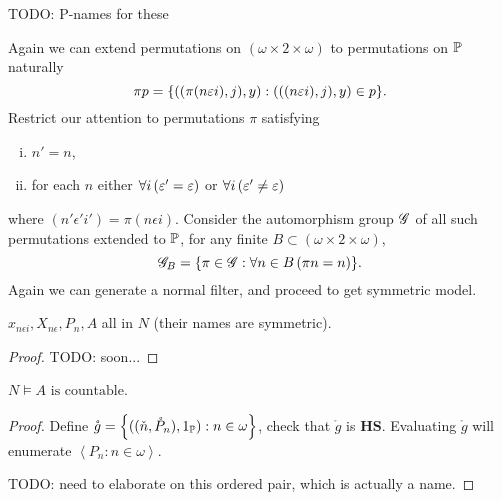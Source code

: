 TODO: P-names for these

Again we can extend permutations on \((\omega\times2\times\omega)\) to permutations on \(\P\) naturally
\[\pi p = \set{ ((\pi(n\epsilon i), j), y): (((n\epsilon i),j), y) \in p }.\]
Restrict our attention to permutations \(\pi\) satisfying
\begin{enumerate}[i.]
    \item \(n' = n\),
    \item for each \(n\) either \(\forall i\paren{\epsilon' = \epsilon}\) or \(\forall i\paren{\epsilon' \ne \epsilon}\)
\end{enumerate}
where \((n'\epsilon' i') = \pi(n\epsilon i)\).
Consider the automorphism group \(\G\) of all such permutations extended to \(\P\),
for any finite \(B\subset (\omega\times2\times\omega)\),
\[ \G_B = \set{ \pi\in \G: \forall n\in B\left( \pi n = n \right) }. \]
Again we can generate a normal filter, and proceed to get symmetric model.


\begin{lemma}
    \(x_{n\epsilon i}, X_{n\epsilon}, P_n, A\) all in \(N\) (their names are symmetric).
\end{lemma}
\begin{proof}
    TODO: soon...
\end{proof}

\begin{lemma}
    \(N\models A\text{ is countable}\).
\end{lemma}
\begin{proof}
  Define \(\mathring{g} = \set{((\check{n}, \mathring{P}_n), 1_\P): n\in\omega}\), check that \(\mathring{g}\) is \(\mathbf{HS}\).
  Evaluating \(\mathring{g}\) will enumerate \(\left\langle P_n: n\in\omega\right\rangle\).

  TODO: need to elaborate on this ordered pair, which is actually a name.
\end{proof}

